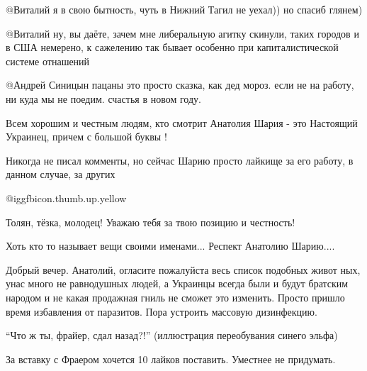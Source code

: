 \begin{multicols}{2}
\begin{itemize}
 @Виталий  я в свою бытность, чуть в Нижний Тагил не уехал)) но спасиб глянем)

 @Виталий  ну, вы даёте, зачем мне либеральную агитку скинули, таких городов и
 в США немерено, к сажелению так бывает особенно при капиталистической системе
 отнашений

 @Андрей Синицын  пацаны это просто сказка, как дед мороз. если не на работу,
 ни куда мы не поедим. счастья в новом году.
\end{itemize} %

Всем хорошим и честным людям, кто смотрит Анатолия Шария - это Настоящий
Украинец, причем с большой буквы !

Никогда не писал комменты, но сейчас Шарию просто лайкище за его работу, в
данном случае, за других

 @igg{fbicon.thumb.up.yellow} 

Толян, тёзка, молодец! Уважаю тебя за твою позицию и честность!

Хоть кто то называет вещи своими именами... Респект Анатолию Шарию....


Добрый вечер. Анатолий, огласите пожалуйста весь список подобных живот ных,
унас много не равнодушных людей, а Украинцы всегда были и будут братским
народом и не какая продажная гниль не сможет это изменить. Просто пришло время
избавления от паразитов. Пора устроить массовую дизинфекцию.


\enquote{Что ж ты, фрайер, сдал назад?!} (иллюстрация переобувания синего эльфа)


За вставку с Фраером хочется 10 лайков поставить. Уместнее не придумать.

\end{multicols} %

\zzrule

